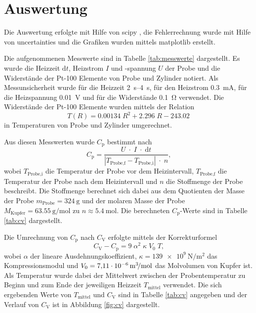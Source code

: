 \newpage
\section{Auswertung}
\label{sec:Auswertung}

Die Auswertung erfolgte mit Hilfe von scipy \cite{scipy},
die Fehlerrechnung wurde mit Hilfe von uncertainties \cite{uncertainties}
und die Grafiken wurden mittels matplotlib \cite{matplotlib} erstellt.

Die aufgenommenen Messwerte sind in Tabelle \ref{tab:messwerte}
dargestellt. Es wurde die Heizzeit $\text{d}t$, Heizstrom $I$ und -spannung $U$ der Probe und
die Widerstände der Pt-100 Elemente von Probe und Zylinder notiert. Als Messunsicherheit
wurde für die Heizzeit \SIrange{2}{4}{\second},
für den Heizstrom \SI{0.3}{\milli\ampere},
für die Heizspannung \SI{0.01}{\volt} und
für die Widerstände \SI{0.1}{\ohm} verwendet.
Die Widerstände der Pt-100 Elemente wurden mittels der Relation
\begin{equation}
    T(R) = \num{0.00134}\;R^2 + \num{2.296}\;R - \num{243.02}
\end{equation}
in Temperaturen von Probe und Zylinder umgerechnet.



Aus diesen Messwerten wurde $C_\text{p}$ bestimmt nach
\begin{equation*}
    C_\text{p} = \frac{U\;\cdot\;I\;\cdot\;\text{d}t}{|T_\text{Probe,f}-T_\text{Probe,i}|\;\cdot\;n}
    \text{,}
\end{equation*}
wobei $T_\text{Probe,i}$ die Temperatur der Probe vor dem Heizintervall, $T_\text{Probe,f}$
die Temperatur der Probe nach dem Heizintervall und $n$ die Stoffmenge der Probe beschreibt.
Die Stoffmenge berechnet sich dabei aus dem Quotienten der Masse der Probe
$m_\text{Probe} = \SI{324}{\gram}$ \cite{anleitung} und der molaren Masse der Probe
$M_\text{Kupfer} = \SI{63.55}{\gram\per\mole}$ \cite{lenntech} zu
$n \approx \SI{5.4}{\mole}$. Die berechneten $C_\text{p}$-Werte sind in Tabelle
\ref{tab:cv} dargestellt.

Die Umrechnung von $C_\text{p}$ nach $C_\text{V}$ erfolgte mittels der Korrekturformel
\begin{equation}
    C_\text{V} - C_\text{p} = 9\;\alpha^2\;\kappa\;V_0\;T\text{,}
    \label{eqn:TausR}
\end{equation}
wobei $\alpha$ der lineare Ausdehnungskoeffizient,
$\kappa = \SI{139e9}{\newton\per\meter\squared}$ \cite{demtroeder} das Kompressionsmodul
und $V_0 = \SI{7.11e-6}{\raiseto{3}\meter\per\mole}$ \cite{webelements} das Molvolumen
von Kupfer ist. Als Temperatur wurde dabei der Mittelwert zwischen der Probentemperatur
zu Beginn und zum Ende der jeweiligen Heizzeit $T_\text{mittel}$ verwendet.
Die sich ergebenden Werte von $T_\text{mittel}$ und $C_\text{V}$ sind in Tabelle
\ref{tab:cv} angegeben und der Verlauf von $C_\text{V}$ ist in Abbildung
\ref{fig:cv} dargestellt.


